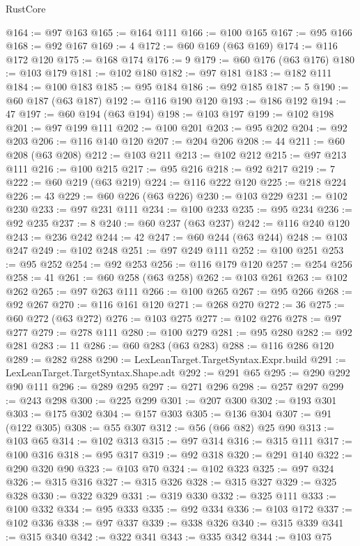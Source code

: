 \begin{lexlean}{RustCore}
\begin{coremodule}
@164 := @97 @163
@165 := @164 @111
@166 := @100 @165
@167 := @95 @166
@168 := @92 @167
@169 := 4
@172 := @60 @169 (@63 @169)
@174 := @116 @172 @120
@175 := @168 @174
@176 := 9
@179 := @60 @176 (@63 @176)
@180 := @103 @179
@181 := @102 @180
@182 := @97 @181
@183 := @182 @111
@184 := @100 @183
@185 := @95 @184
@186 := @92 @185
@187 := 5
@190 := @60 @187 (@63 @187)
@192 := @116 @190 @120
@193 := @186 @192
@194 := 47
@197 := @60 @194 (@63 @194)
@198 := @103 @197
@199 := @102 @198
@201 := @97 @199 @111
@202 := @100 @201
@203 := @95 @202
@204 := @92 @203
@206 := @116 @140 @120
@207 := @204 @206
@208 := 44
@211 := @60 @208 (@63 @208)
@212 := @103 @211
@213 := @102 @212
@215 := @97 @213 @111
@216 := @100 @215
@217 := @95 @216
@218 := @92 @217
@219 := 7
@222 := @60 @219 (@63 @219)
@224 := @116 @222 @120
@225 := @218 @224
@226 := 43
@229 := @60 @226 (@63 @226)
@230 := @103 @229
@231 := @102 @230
@233 := @97 @231 @111
@234 := @100 @233
@235 := @95 @234
@236 := @92 @235
@237 := 8
@240 := @60 @237 (@63 @237)
@242 := @116 @240 @120
@243 := @236 @242
@244 := 42
@247 := @60 @244 (@63 @244)
@248 := @103 @247
@249 := @102 @248
@251 := @97 @249 @111
@252 := @100 @251
@253 := @95 @252
@254 := @92 @253
@256 := @116 @179 @120
@257 := @254 @256
@258 := 41
@261 := @60 @258 (@63 @258)
@262 := @103 @261
@263 := @102 @262
@265 := @97 @263 @111
@266 := @100 @265
@267 := @95 @266
@268 := @92 @267
@270 := @116 @161 @120
@271 := @268 @270
@272 := 36
@275 := @60 @272 (@63 @272)
@276 := @103 @275
@277 := @102 @276
@278 := @97 @277
@279 := @278 @111
@280 := @100 @279
@281 := @95 @280
@282 := @92 @281
@283 := 11
@286 := @60 @283 (@63 @283)
@288 := @116 @286 @120
@289 := @282 @288
@290 := LexLeanTarget.TargetSyntax.Expr.build
@291 := LexLeanTarget.TargetSyntax.Shape.adt
@292 := @291 @65
@295 := @290 @292 @90 @111
@296 := @289 @295
@297 := @271 @296
@298 := @257 @297
@299 := @243 @298
@300 := @225 @299
@301 := @207 @300
@302 := @193 @301
@303 := @175 @302
@304 := @157 @303
@305 := @136 @304
@307 := @91 (@122 @305)
@308 := @55 @307
@312 := @56 (@66 @82) @25 @90
@313 := @103 @65
@314 := @102 @313
@315 := @97 @314
@316 := @315 @111
@317 := @100 @316
@318 := @95 @317
@319 := @92 @318
@320 := @291 @140
@322 := @290 @320 @90
@323 := @103 @70
@324 := @102 @323
@325 := @97 @324
@326 := @315 @316
@327 := @315 @326
@328 := @315 @327
@329 := @325 @328
@330 := @322 @329
@331 := @319 @330
@332 := @325 @111
@333 := @100 @332
@334 := @95 @333
@335 := @92 @334
@336 := @103 @172
@337 := @102 @336
@338 := @97 @337
@339 := @338 @326
@340 := @315 @339
@341 := @315 @340
@342 := @322 @341
@343 := @335 @342
@344 := @103 @75

\end{coremodule}
\end{lexlean}
